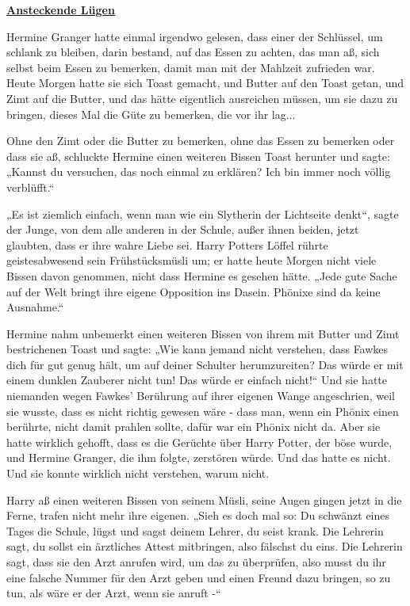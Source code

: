 

\hypertarget{ansteckende-luxfcgen}{%

\textbf{\uline{Ansteckende Lügen}}

\hfill\break Hermine Granger hatte einmal irgendwo gelesen, dass einer der Schlüssel, um schlank zu bleiben, darin bestand, auf das Essen zu achten, das man aß, sich selbst beim Essen zu bemerken, damit man mit der Mahlzeit zufrieden war. Heute Morgen hatte sie sich Toast gemacht, und Butter auf den Toast getan, und Zimt auf die Butter, und das hätte eigentlich ausreichen müssen, um sie dazu zu bringen, dieses Mal die Güte zu bemerken, die vor ihr lag...

Ohne den Zimt oder die Butter zu bemerken, ohne das Essen zu bemerken oder dass sie aß, schluckte Hermine einen weiteren Bissen Toast herunter und sagte: „Kannst du versuchen, das noch einmal zu erklären? Ich bin immer noch völlig verblüfft.“

„Es ist ziemlich einfach, wenn man wie ein Slytherin der Lichtseite denkt“, sagte der Junge, von dem alle anderen in der Schule, außer ihnen beiden, jetzt glaubten, dass er ihre wahre Liebe sei. Harry Potters Löffel rührte geistesabwesend sein Frühstücksmüsli um; er hatte heute Morgen nicht viele Bissen davon genommen, nicht dass Hermine es gesehen hätte. „Jede gute Sache auf der Welt bringt ihre eigene Opposition ins Dasein. Phönixe sind da keine Ausnahme.“

Hermine nahm unbemerkt einen weiteren Bissen von ihrem mit Butter und Zimt bestrichenen Toast und sagte: „Wie kann jemand nicht verstehen, dass Fawkes dich für gut genug hält, um auf deiner Schulter herumzureiten? Das würde er mit einem dunklen Zauberer nicht tun! Das würde er einfach nicht!“ Und sie hatte niemanden wegen Fawkes' Berührung auf ihrer eigenen Wange angeschrien, weil sie wusste, dass es nicht richtig gewesen wäre - dass man, wenn ein Phönix einen berührte, nicht damit prahlen sollte, dafür war ein Phönix nicht da. Aber sie hatte wirklich gehofft, dass es die Gerüchte über Harry Potter, der böse wurde, und Hermine Granger, die ihm folgte, zerstören würde. Und das hatte es nicht. Und sie konnte wirklich nicht verstehen, warum nicht.

Harry aß einen weiteren Bissen von seinem Müsli, seine Augen gingen jetzt in die Ferne, trafen nicht mehr ihre eigenen. „Sieh es doch mal so: Du schwänzt eines Tages die Schule, lügst und sagst deinem Lehrer, du seist krank. Die Lehrerin sagt, du sollst ein ärztliches Attest mitbringen, also fälschst du eins. Die Lehrerin sagt, dass sie den Arzt anrufen wird, um das zu überprüfen, also musst du ihr eine falsche Nummer für den Arzt geben und einen Freund dazu bringen, so zu tun, als wäre er der Arzt, wenn sie anruft -“

}
